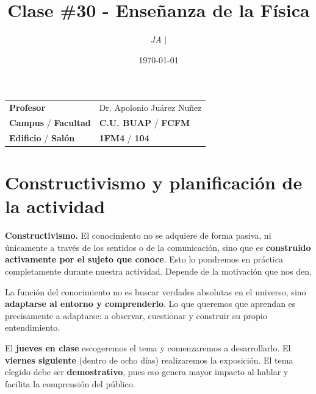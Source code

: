 \documentclass{article}
\title{Clase \#30 - Enseñanza de la Física}
\author{\emph{JA} $\boldsymbol{\mid}$}
\date{\today}
\begin{document}
\maketitle



\begin{mybox}
  \noindent\begin{tabular}{@{}ll}
    {\bfseries{Profesor}} & Dr. Apolonio Juárez Nuñez\\
    \textcolor{prussianblue}{\bfseries{Campus}} / \textcolor{trueblue}{\bfseries{Facultad}}  & \textcolor{prussianblue}{\bfseries{C.U. BUAP}} /  \textcolor{trueblue}{\bfseries{FCFM}} \\
    \textcolor{prussianblue}{\bfseries{Edificio}} /  \textcolor{trueblue}{\bfseries{Salón}}    &   \textcolor{prussianblue}{\bfseries{1FM4}} /  \textcolor{trueblue}{\bfseries{104}}   
  \end{tabular} 
\end{mybox} \vspace{1cm}



\vspace{2cm}
\tableofcontents  \vspace{2cm}

\section*{Constructivismo y planificación de la actividad}

\textbf{Constructivismo.}  
El conocimiento no se adquiere de forma pasiva, ni únicamente a través de los sentidos o de la comunicación,  
sino que es \textbf{construido activamente por el sujeto que conoce}.  
Esto lo pondremos en práctica completamente durante nuestra actividad. Depende de la motivación que nos den.

\vspace{1em}

\noindent
La función del conocimiento no es buscar verdades absolutas en el universo,  
sino \textbf{adaptarse al entorno y comprenderlo}.  
Lo que queremos que aprendan es precisamente a adaptarse: a observar, cuestionar y construir su propio entendimiento.

\vspace{1em}

\noindent
El \textbf{jueves en clase} escogeremos el tema y comenzaremos a desarrollarlo.  
El \textbf{viernes siguiente} (dentro de ocho días) realizaremos la exposición.  
El tema elegido debe ser \textbf{demostrativo}, pues eso genera mayor impacto al hablar y facilita la comprensión del público.
\end{document}
